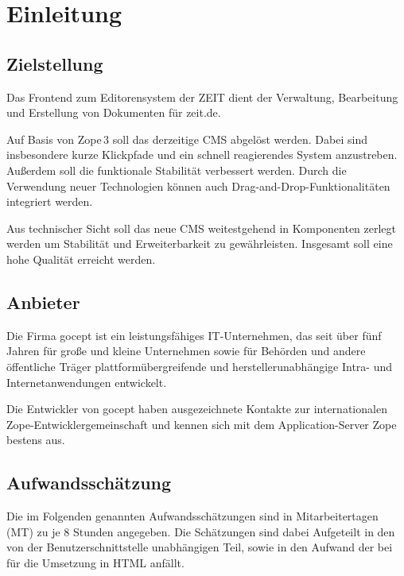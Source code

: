 %


\chapter{Einleitung}


\section{Zielstellung}

Das Frontend zum Editorensystem der ZEIT dient der Verwaltung,
Bearbeitung und Erstellung von Dokumenten für zeit.de.

Auf Basis von Zope\,3 soll das derzeitige CMS abgelöst werden. Dabei sind
insbesondere kurze Klickpfade und ein schnell reagierendes System anzustreben. 
Außerdem soll die funktionale Stabilität verbessert werden. Durch die
Verwendung neuer Technologien können auch Drag-and-Drop-Funktionalitäten
integriert werden.

Aus technischer Sicht soll das neue CMS weitestgehend in Komponenten zerlegt
werden um Stabilität und Erweiterbarkeit zu gewährleisten. Insgesamt soll eine
hohe Qualität erreicht werden.



\section{Anbieter}

Die Firma gocept ist ein leistungsfähiges IT-Unternehmen, das seit  
über fünf Jahren für große und kleine Unternehmen sowie für Behörden  
und andere öffentliche Träger plattformübergreifende und  
herstellerunabhängige Intra- und Internetanwendungen entwickelt.

Die Entwickler von gocept haben ausgezeichnete Kontakte zur  
internationalen Zope-Entwicklergemeinschaft und kennen sich mit dem
Application-Server Zope bestens aus. 




\section{Aufwandsschätzung}

Die im Folgenden genannten Aufwandsschätzungen sind in Mitarbeitertagen (MT)
zu je 8 Stunden angegeben. Die Schätzungen sind dabei Aufgeteilt in den von
der Benutzerschnittstelle unabhängigen Teil, sowie in den Aufwand der bei
für die Umsetzung in HTML anfällt.

